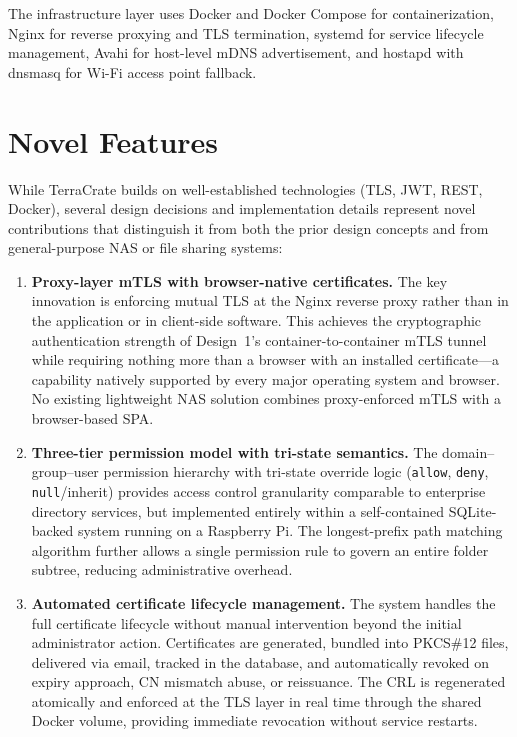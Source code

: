 \documentclass[12pt,letterpaper]{report}
\begin{document}
The infrastructure layer uses Docker and Docker Compose for containerization, Nginx for reverse proxying and TLS termination, systemd for service lifecycle management, Avahi for host-level mDNS advertisement, and hostapd with dnsmasq for Wi-Fi access point fallback.

\section{Novel Features}

While TerraCrate builds on well-established technologies (TLS, JWT, REST, Docker), several design decisions and implementation details represent novel contributions that distinguish it from both the prior design concepts and from general-purpose NAS or file sharing systems:

\begin{enumerate}
    \item \textbf{Proxy-layer mTLS with browser-native certificates.} The key innovation is enforcing mutual TLS at the Nginx reverse proxy rather than in the application or in client-side software. This achieves the cryptographic authentication strength of Design~1's container-to-container mTLS tunnel while requiring nothing more than a browser with an installed certificate---a capability natively supported by every major operating system and browser. No existing lightweight NAS solution combines proxy-enforced mTLS with a browser-based SPA.

    \item \textbf{Three-tier permission model with tri-state semantics.} The domain--group--user permission hierarchy with tri-state override logic (\texttt{allow}, \texttt{deny}, \texttt{null}/inherit) provides access control granularity comparable to enterprise directory services, but implemented entirely within a self-contained SQLite-backed system running on a Raspberry Pi. The longest-prefix path matching algorithm further allows a single permission rule to govern an entire folder subtree, reducing administrative overhead.

    \item \textbf{Automated certificate lifecycle management.} The system handles the full certificate lifecycle without manual intervention beyond the initial administrator action. Certificates are generated, bundled into PKCS\#12 files, delivered via email, tracked in the database, and automatically revoked on expiry approach, CN mismatch abuse, or reissuance. The CRL is regenerated atomically and enforced at the TLS layer in real time through the shared Docker volume, providing immediate revocation without service restarts.


\end{enumerate}
\end{document}
